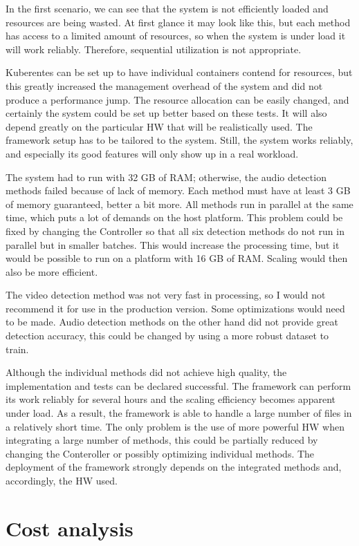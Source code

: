 In the first scenario, we can see that the system is not efficiently loaded and resources are being wasted. At first glance it may look like this, but each method has access to a limited amount of resources, so when the system is under load it will work reliably. Therefore, sequential utilization is not appropriate.

Kuberentes can be set up to have individual containers contend for resources, but this greatly increased the management overhead of the system and did not produce a performance jump. The resource allocation can be easily changed, and certainly the system could be set up better based on these tests. It will also depend greatly on the particular HW that will be realistically used. The framework setup has to be tailored to the system. Still, the system works reliably, and especially its good features will only show up in a real workload.

The system had to run with 32 GB of RAM; otherwise, the audio detection methods failed because of lack of memory. Each method must have at least 3 GB of memory guaranteed, better a bit more. All methods run in parallel at the same time, which puts a lot of demands on the host platform. This problem could be fixed by changing the Controller so that all six detection methods do not run in parallel but in smaller batches. This would increase the processing time, but it would be possible to run on a platform with 16 GB of RAM. Scaling would then also be more efficient.

The video detection method was not very fast in processing, so I would not recommend it for use in the production version. Some optimizations would need to be made. Audio detection methods on the other hand did not provide great detection accuracy, this could be changed by using a more robust dataset to train.

Although the individual methods did not achieve high quality, the implementation and tests can be declared successful. The framework can perform its work reliably for several hours and the scaling efficiency becomes apparent under load. As a result, the framework is able to handle a large number of files in a relatively short time. The only problem is the use of more powerful HW when integrating a large number of methods, this could be partially reduced by changing the Conteroller or possibly optimizing individual methods. The deployment of the framework strongly depends on the integrated methods and, accordingly, the HW used. 

\section{Cost analysis}

